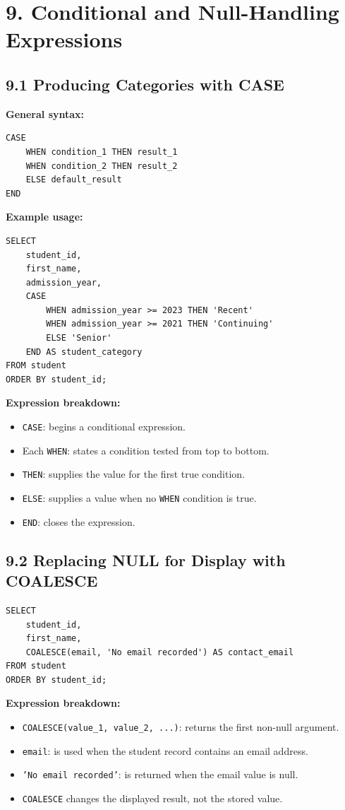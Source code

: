 \documentclass[12pt,a4paper]{article}
\begin{document}
\section*{9. Conditional and Null-Handling Expressions}

\subsection*{9.1 Producing Categories with CASE}
\noindent\textbf{General syntax:}
\begin{verbatim}
CASE
    WHEN condition_1 THEN result_1
    WHEN condition_2 THEN result_2
    ELSE default_result
END
\end{verbatim}

\noindent\textbf{Example usage:}
\begin{verbatim}
SELECT
    student_id,
    first_name,
    admission_year,
    CASE
        WHEN admission_year >= 2023 THEN 'Recent'
        WHEN admission_year >= 2021 THEN 'Continuing'
        ELSE 'Senior'
    END AS student_category
FROM student
ORDER BY student_id;
\end{verbatim}

\noindent\textbf{Expression breakdown:}
\begin{itemize}
    \item \texttt{CASE}: begins a conditional expression.
    \item Each \texttt{WHEN}: states a condition tested from top to bottom.
    \item \texttt{THEN}: supplies the value for the first true condition.
    \item \texttt{ELSE}: supplies a value when no \texttt{WHEN} condition is true.
    \item \texttt{END}: closes the expression.
\end{itemize}

\subsection*{9.2 Replacing NULL for Display with COALESCE}
\begin{verbatim}
SELECT
    student_id,
    first_name,
    COALESCE(email, 'No email recorded') AS contact_email
FROM student
ORDER BY student_id;
\end{verbatim}

\noindent\textbf{Expression breakdown:}
\begin{itemize}
    \item \texttt{COALESCE(value\_1, value\_2, ...)}: returns the first non-null argument.
    \item \texttt{email}: is used when the student record contains an email address.
    \item \texttt{'No email recorded'}: is returned when the email value is null.
    \item \texttt{COALESCE} changes the displayed result, not the stored value.
\end{itemize}
\end{document}
